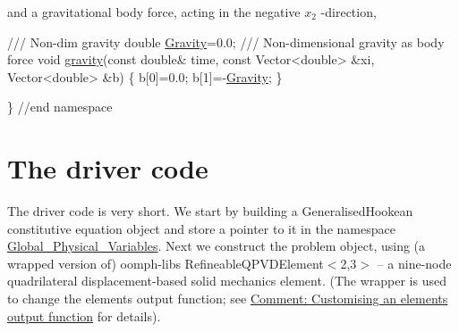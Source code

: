 and a gravitational body force, acting in the negative $ x_2 $ -\/direction,


\begin{DoxyCodeInclude}
 \textcolor{comment}{/// Non-dim gravity}
 \textcolor{keywordtype}{double} \hyperlink{namespaceGlobal__Physical__Variables_a8b80d3e8d63b8d0a0ed435a2dd7fe2ad}{Gravity}=0.0;
\textcolor{comment}{}
\textcolor{comment}{ /// Non-dimensional gravity as body force}
\textcolor{comment}{} \textcolor{keywordtype}{void} \hyperlink{namespaceGlobal__Physical__Variables_a0777aef63372db7f91ad894c38159681}{gravity}(\textcolor{keyword}{const} \textcolor{keywordtype}{double}& time, 
              \textcolor{keyword}{const} Vector<double> &xi, 
              Vector<double> &b)
 \{
  b[0]=0.0;
  b[1]=-\hyperlink{namespaceGlobal__Physical__Variables_a8b80d3e8d63b8d0a0ed435a2dd7fe2ad}{Gravity};
 \}
 
\} \textcolor{comment}{//end namespace}

\end{DoxyCodeInclude}




 

\hypertarget{index_main}{}\section{The driver code}\label{index_main}
The driver code is very short. We start by building a {\ttfamily Generalised\+Hookean} constitutive equation object and store a pointer to it in the namespace {\ttfamily \hyperlink{namespaceGlobal__Physical__Variables}{Global\+\_\+\+Physical\+\_\+\+Variables}}. Next we construct the problem object, using (a wrapped version of) {\ttfamily oomph-\/lib\textquotesingle{}s} {\ttfamily Refineable\+Q\+P\+V\+D\+Element$<$2,3$>$} -- a nine-\/node quadrilateral displacement-\/based solid mechanics element. (The wrapper is used to change the element\textquotesingle{}s output function; see \hyperlink{index_com}{Comment\+: Customising an element\textquotesingle{}s output function} for details).

